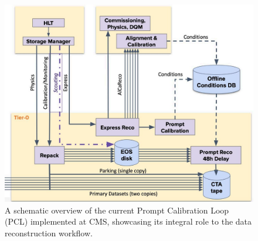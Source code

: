 




\begin{figure}[h!]	
\centering
\includegraphics[width=\textwidth]{figures/PCL.jpg} %
\caption{A schematic overview of the current Prompt Calibration Loop (PCL) implemented at CMS, showcasing its integral role to the data reconstruction workflow.} %
\label{fig:PCL}
\end{figure}


